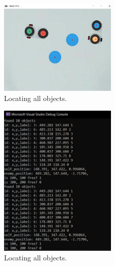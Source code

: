     \begin{figure}[thb]
        \centering
        \includegraphics[width=0.5\textwidth]{images/IP_result.png}
        \caption[Locating all objects]{Locating all objects.}\label{IP_result}
    \end{figure}

    \begin{figure}[thb]
        \centering
        \includegraphics[width=0.5\textwidth]{images/IP_result2.jpeg}
        \caption[Locating all objects]{Locating all objects.}\label{IP_result2}
    \end{figure}
